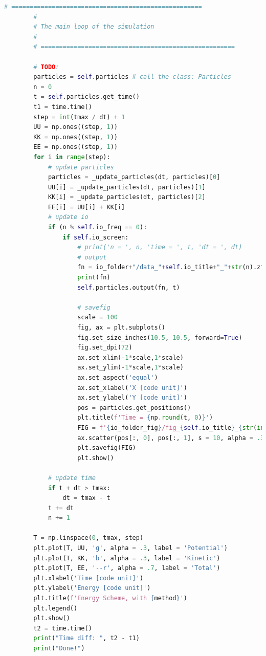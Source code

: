 \documentclass[12pt]{article}
\begin{document}
\begin{lstlisting}[language={Python}]
        # ====================================================
        #
        # The main loop of the simulation
        #
        # =====================================================

        # TODO:
        particles = self.particles # call the class: Particles
        n = 0
        t = self.particles.get_time()
        t1 = time.time()
        step = int(tmax / dt) + 1
        UU = np.ones((step, 1))
        KK = np.ones((step, 1))
        EE = np.ones((step, 1))
        for i in range(step):
            # update particles
            particles = _update_particles(dt, particles)[0]
            UU[i] = _update_particles(dt, particles)[1]
            KK[i] = _update_particles(dt, particles)[2]
            EE[i] = UU[i] + KK[i]
            # update io
            if (n % self.io_freq == 0):
                if self.io_screen:
                    # print('n = ', n, 'time = ', t, 'dt = ', dt)
                    # output
                    fn = io_folder+"/data_"+self.io_title+"_"+str(n).zfill(5)+".txt"
                    print(fn)
                    self.particles.output(fn, t)

                    # savefig
                    scale = 100
                    fig, ax = plt.subplots()
                    fig.set_size_inches(10.5, 10.5, forward=True)
                    fig.set_dpi(72)
                    ax.set_xlim(-1*scale,1*scale)
                    ax.set_ylim(-1*scale,1*scale)
                    ax.set_aspect('equal')
                    ax.set_xlabel('X [code unit]')
                    ax.set_ylabel('Y [code unit]')
                    pos = particles.get_positions()
                    plt.title(f'Time = {np.round(t, 0)}')
                    FIG = f'{io_folder_fig}/fig_{self.io_title}_{str(int(0.01 * n)).zfill(1)}.png'
                    ax.scatter(pos[:, 0], pos[:, 1], s = 10, alpha = .3)
                    plt.savefig(FIG)
                    plt.show()
            
            # update time
            if t + dt > tmax:
                dt = tmax - t
            t += dt
            n += 1
        
        T = np.linspace(0, tmax, step)
        plt.plot(T, UU, 'g', alpha = .3, label = 'Potential')
        plt.plot(T, KK, 'b', alpha = .3, label = 'Kinetic')
        plt.plot(T, EE, '--r', alpha = .7, label = 'Total')
        plt.xlabel('Time [code unit]')
        plt.ylabel('Energy [code unit]')
        plt.title(f'Energy Scheme, with {method}')
        plt.legend()
        plt.show()
        t2 = time.time()
        print("Time diff: ", t2 - t1)
        print("Done!")
        

\end{lstlisting}
\end{document}
